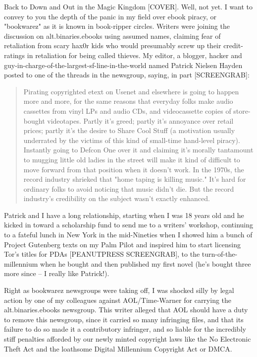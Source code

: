 Back to Down and Out in the Magic Kingdom [COVER]. Well, not yet. I
want to convey to you the depth of the panic in my field over ebook
piracy, or "bookwarez" as it is known in book-ripper circles.
Writers were joining the discussion on alt.binaries.ebooks using
assumed names, claiming fear of retaliation from scary hax0r kids
who would presumably screw up their credit-ratings in retaliation
for being called thieves. My editor, a blogger, hacker and
guy-in-charge-of-the-largest-sf-line-in-the-world named Patrick
Nielsen Hayden posted to one of the threads in the newsgroup,
saying, in part [SCREENGRAB]:

\begin{quote}
Pirating copyrighted etext on Usenet and elsewhere is going to
happen more and more, for the same reasons that everyday folks make
audio cassettes from vinyl LPs and audio CDs, and videocassette
copies of store-bought videotapes. Partly it's greed; partly it's
annoyance over retail prices; partly it's the desire to Share Cool
Stuff (a motivation usually underrated by the victims of this kind
of small-time hand-level piracy). Instantly going to Defcon One
over it and claiming it's morally tantamount to mugging little old
ladies in the street will make it kind of difficult to move forward
from that position when it doesn't work. In the 1970s, the record
industry shrieked that "home taping is killing music." It's hard
for ordinary folks to avoid noticing that music didn't die. But the
record industry's credibility on the subject wasn't exactly
enhanced.
\end{quote}

Patrick and I have a long relationship, starting when I was 18
years old and he kicked in toward a scholarship fund to send me to
a writers' workshop, continuing to a fateful lunch in New York in
the mid-Nineties when I showed him a bunch of Project Gutenberg
texts on my Palm Pilot and inspired him to start licensing Tor's
titles for PDAs [PEANUTPRESS SCREENGRAB], to the
turn-of-the-millennium when he bought and then published my first
novel (he's bought three more since -- I really like Patrick!).

Right as bookwarez newsgroups were taking off, I was shocked silly
by legal action by one of my colleagues against AOL/Time-Warner for
carrying the alt.binaries.ebooks newsgroup. This writer alleged
that AOL should have a duty to remove this newsgroup, since it
carried so many infringing files, and that its failure to do so
made it a contributory infringer, and so liable for the incredibly
stiff penalties afforded by our newly minted copyright laws like
the No Electronic Theft Act and the loathsome Digital Millennium
Copyright Act or DMCA.

